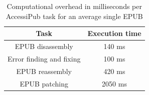 \begin{table}[h!]
\small
\begin{center}
\begin{tabular}{ | c | c |} 
\hline
\textbf{Task} & \textbf{Execution time} \\
\hline
EPUB disassembly & 140 ms \\
\hline
Error finding and fixing & 100 ms \\
\hline
EPUB reassembly & 420 ms \\
\hline
EPUB patching & 2050 ms \\
\hline
\end{tabular}
\end{center}
\normalsize
\caption{Computational overhead in milliseconds per AccessiPub task for an average single EPUB}
\label{table:computational_overhead}
\end{table}